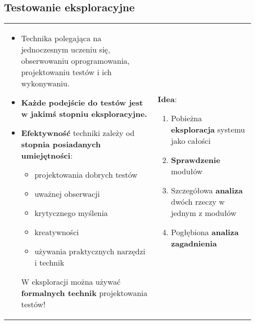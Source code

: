 \documentclass[../main.tex]{subfiles}
\begin{document}
    \subsection{Testowanie eksploracyjne}

    \begin{table}[H]
        \begin{center}
            \begin{tabular}{p{8cm} p{8cm}}
                \begin{itemize}
                    \item Technika polegająca na jednoczesnym uczeniu się, obserwowaniu
                    oprogramowania, projektowaniu testów i ich wykonywaniu.

                    \item \textbf{Każde podejście do testów jest w jakimś stopniu eksploracyjne.}

                    \item \textbf{Efektywność} techniki zależy od \textbf{stopnia posiadanych umiejętności}:
                    \begin{itemize}
                        \item projektowania dobrych testów
                        \item uważnej obserwacji
                        \item krytycznego myślenia
                        \item kreatywności
                        \item używania praktycznych narzędzi i technik
                    \end{itemize}
                    W eksploracji można używać \textbf{formalnych technik} projektowania testów!
                \end{itemize}
                &
                \textbf{Idea}:
                \begin{enumerate}
                    \item Pobieżna \textbf{eksploracja} systemu jako całości
                    \item \textbf{Sprawdzenie} modułów
                    \item Szczegółowa \textbf{analiza} dwóch rzeczy w jednym z modułów
                    \item Pogłębiona \textbf{analiza zagadnienia}
                \end{enumerate}
            \end{tabular}
        \end{center}
    \end{table}
\end{document}
